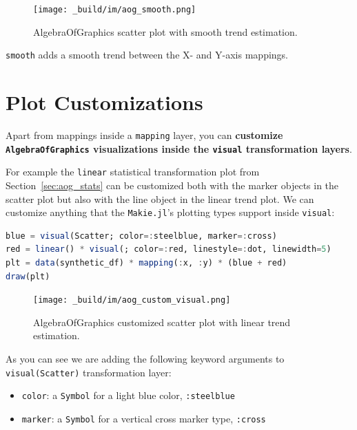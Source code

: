 \documentclass[
  notoc %
]{tufte-book}
\providecommand{\tightlist}{%
  \setlength{\itemsep}{0pt}\setlength{\parskip}{0pt}
}
\newcommand{\passthrough}[1]{#1}
\begin{document}
\begin{figure}
\hypertarget{fig:aog_smooth}{%
\centering
\texttt{[image: \_build/im/aog\_smooth.png]}
\caption{AlgebraOfGraphics scatter plot with smooth trend
estimation.}\label{fig:aog_smooth}
}
\end{figure}

\passthrough{\lstinline!smooth!} adds a smooth trend between the X- and
Y-axis mappings.

\hypertarget{sec:aog_custom}{%
\section{Plot Customizations}\label{sec:aog_custom}}

Apart from mappings inside a \passthrough{\lstinline!mapping!} layer,
you can \textbf{customize \passthrough{\lstinline!AlgebraOfGraphics!}
visualizations inside the \passthrough{\lstinline!visual!}
transformation layers}.

For example the \passthrough{\lstinline!linear!} statistical
transformation plot from Section~\ref{sec:aog_stats} can be customized
both with the marker objects in the scatter plot but also with the line
object in the linear trend plot. We can customize anything that the
\passthrough{\lstinline!Makie.jl!}'s plotting types support inside
\passthrough{\lstinline!visual!}:

\begin{lstlisting}[language=Julia]
blue = visual(Scatter; color=:steelblue, marker=:cross)
red = linear() * visual(; color=:red, linestyle=:dot, linewidth=5)
plt = data(synthetic_df) * mapping(:x, :y) * (blue + red)
draw(plt)
\end{lstlisting}

\begin{figure}
\hypertarget{fig:aog_custom_visual}{%
\centering
\texttt{[image: \_build/im/aog\_custom\_visual.png]}
\caption{AlgebraOfGraphics customized scatter plot with linear trend
estimation.}\label{fig:aog_custom_visual}
}
\end{figure}

As you can see we are adding the following keyword arguments to
\passthrough{\lstinline!visual(Scatter)!} transformation layer:

\begin{itemize}
\tightlist
\item
  \passthrough{\lstinline!color!}: a \passthrough{\lstinline!Symbol!}
  for a light blue color, \passthrough{\lstinline!:steelblue!}
\item
  \passthrough{\lstinline!marker!}: a \passthrough{\lstinline!Symbol!}
  for a vertical cross marker type, \passthrough{\lstinline!:cross!}
\end{itemize}
\end{document}
